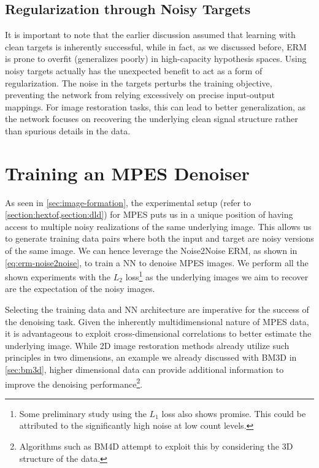 \subsection{Regularization through Noisy Targets}
It is important to note that the earlier discussion assumed that learning with clean targets is inherently successful, while in fact, as we discussed before, \gls{ERM} is prone to overfit (generalizes poorly) in high-capacity hypothesis spaces. Using noisy targets actually has the unexpected benefit to act as a form of regularization. The noise in the targets perturbs the training objective, preventing the network from relying excessively on precise input-output mappings. For image restoration tasks, this can lead to better generalization, as the network focuses on recovering the underlying clean signal structure rather than spurious details in the data.

\section{Training an MPES Denoiser}
As seen in \cref{sec:image-formation}, the experimental setup (refer to \cref{section:hextof,section:dld}) for \gls{MPES} puts us in a unique position of having access to multiple noisy realizations of the same underlying image. This allows us to generate training data pairs where both the input and target are noisy versions of the same image. We can hence leverage the Noise2Noise \gls{ERM}, as shown in \cref{eq:erm-noise2noise}, to train a \gls{NN} to denoise \gls{MPES} images. We perform all the shown experiments with the $L_2$ loss\footnote{Some preliminary study using the $L_1$ loss also shows promise. This could be attributed to the significantly high noise at low count levels.} as the underlying images we aim to recover are the expectation of the noisy images.

Selecting the training data and \gls{NN} architecture are imperative for the success of the denoising task. Given the inherently multidimensional nature of \gls{MPES} data, it is advantageous to exploit cross-dimensional correlations to better estimate the underlying image. While 2D image restoration methods already utilize such principles in two dimensions, an example we already discussed with \gls{BM3D} in \cref{sec:bm3d}, higher dimensional data can provide additional information to improve the denoising performance\footnote{Algorithms such as BM4D \cite{maggionimNonlocalTransformdomainFilter} attempt to exploit this by considering the 3D structure of the data.}. 


